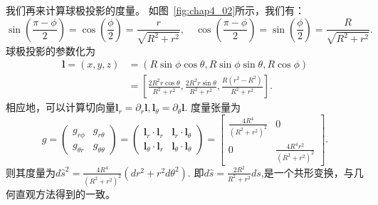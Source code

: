 \documentclass{article}
\begin{document}
我们再来计算球极投影的度量。
如图~\ref{fig:chap4_02}所示，我们有：
\begin{equation*}
\sin\left(\frac{\pi-\phi}{2}\right)
=\cos\left(\frac{\phi}{2}\right)=\frac{r}{\sqrt{R^{2}+r^{2}}}, \quad
\cos\left(\frac{\pi-\phi}{2}\right)
=\sin\left(\frac{\phi}{2}\right)=\frac{R}{\sqrt{R^{2}+r^{2}}}.
\end{equation*}
球极投影的参数化为
\begin{equation*}
\begin{aligned}
\mathbf{l}=(x, y, z)
&=(R\sin\phi\cos\theta, R\sin\phi\sin\theta, R\cos\phi) \\
&=\left[\frac{2R^{2}r\cos\theta}{R^{2}+r^{2}}, \frac{2R^{2}r\sin\theta}{R^{2}+r^{2}}, \frac{R(r^{2}-R^{2})}{R^{2}+r^{2}}\right].
\end{aligned}
\end{equation*}
相应地，可以计算切向量$\mathbf{l}_{r}=\partial_{r}\mathbf{l}, \mathbf{l}_\theta=\partial_{\theta}\mathbf{l}$.
度量张量为
\begin{equation}
g=\begin{pmatrix}
g_{r\phi} & g_{r\theta} \\
g_{\theta{r}} & g_{\theta\theta}
\end{pmatrix}
=\begin{pmatrix}
\mathbf{l}_{r}\cdot\mathbf{l}_{r} & \mathbf{l}_{r}\cdot\mathbf{l}_{\theta} \\
\mathbf{l}_{\theta}\cdot\mathbf{l}_{r} & \mathbf{l}_{\theta}\cdot\mathbf{l}_{\theta}
\end{pmatrix}
=\begin{bmatrix}
\frac{4R^{4}}{\left(R^{2} + r^{2}\right)^{2}} & 0 \\
0 & \frac{4R^{4}r^{2}}{\left(R^{2} + r^{2}\right)^{2}}
\end{bmatrix}.
\end{equation}
则其度量为$d\hat{s}^{2}=\frac{4R^{4}}{\left(R^{2} + r^{2}\right)^{2}}\left(dr^{2}+r^{2}d\theta^{2}\right)$.
即$d\hat{s}=\frac{2R^{2}}{R^{2} + r^{2}}ds$,是一个共形变换，与几何直观方法得到的一致。
\end{document}
